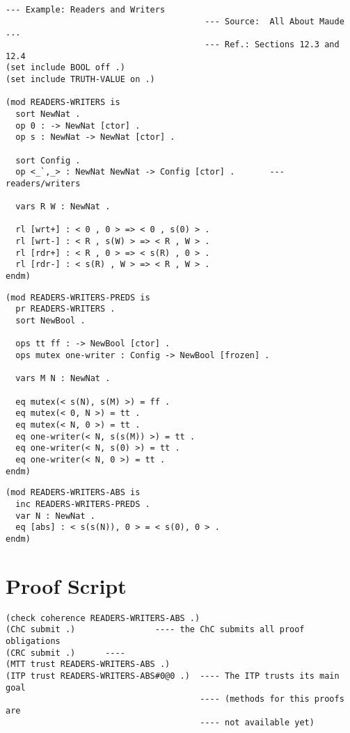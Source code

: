 \documentclass{article}
\begin{document}
\begin{lstlisting}[style=AMMA, language=Maude, numbers=none]
                                        --- Example: Readers and Writers
                                        --- Source:  All About Maude ...
                                        --- Ref.: Sections 12.3 and 12.4
(set include BOOL off .)
(set include TRUTH-VALUE on .)

(mod READERS-WRITERS is
  sort NewNat .
  op 0 : -> NewNat [ctor] .
  op s : NewNat -> NewNat [ctor] .

  sort Config .
  op <_`,_> : NewNat NewNat -> Config [ctor] .       --- readers/writers

  vars R W : NewNat .

  rl [wrt+] : < 0 , 0 > => < 0 , s(0) > .
  rl [wrt-] : < R , s(W) > => < R , W > .
  rl [rdr+] : < R , 0 > => < s(R) , 0 > .
  rl [rdr-] : < s(R) , W > => < R , W > .
endm)
\end{lstlisting}

\begin{lstlisting}[style=AMMA, language=Maude, numbers=none]
(mod READERS-WRITERS-PREDS is
  pr READERS-WRITERS .
  sort NewBool .

  ops tt ff : -> NewBool [ctor] .
  ops mutex one-writer : Config -> NewBool [frozen] .

  vars M N : NewNat .

  eq mutex(< s(N), s(M) >) = ff .
  eq mutex(< 0, N >) = tt .
  eq mutex(< N, 0 >) = tt .
  eq one-writer(< N, s(s(M)) >) = tt .
  eq one-writer(< N, s(0) >) = tt .
  eq one-writer(< N, 0 >) = tt .
endm)
\end{lstlisting}

\begin{lstlisting}[style=AMMA, language=Maude, numbers=none]
(mod READERS-WRITERS-ABS is
  inc READERS-WRITERS-PREDS .
  var N : NewNat .
  eq [abs] : < s(s(N)), 0 > = < s(0), 0 > .
endm)
\end{lstlisting}

\section{Proof Script}

\begin{lstlisting}[style=AMMA, language=Maude, numbers=none]
(check coherence READERS-WRITERS-ABS .)
(ChC submit .)                ---- the ChC submits all proof obligations 
(CRC submit .)      ---- 
(MTT trust READERS-WRITERS-ABS .)
(ITP trust READERS-WRITERS-ABS#0@0 .)  ---- The ITP trusts its main goal 
                                       ---- (methods for this proofs are 
                                       ---- not available yet)
\end{lstlisting}
\end{document}
